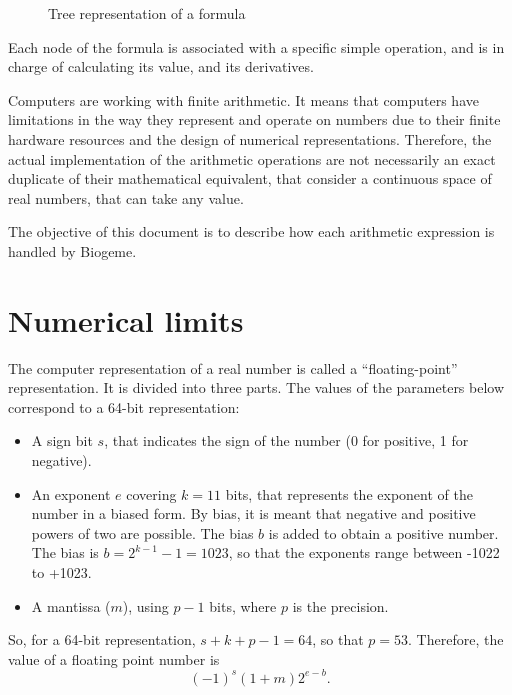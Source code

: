 \documentclass[12pt,a4paper]{article}
\begin{document}
\begin{figure}[htb]
  \begin{center}
  \end{center}
\caption{\label{fig:tree}Tree representation of a formula}
\end{figure}

Each node of the formula is associated with a specific simple
operation, and is in charge of calculating its value, and its
derivatives.


Computers are working with finite arithmetic. It means that computers
have limitations in the way they represent and operate on numbers due
to their finite hardware resources and the design of numerical
representations.  Therefore, the actual implementation of the
arithmetic operations are not necessarily an exact duplicate of their
mathematical equivalent, that consider a continuous space of real
numbers, that can take any value.

The objective of this document is to describe how each arithmetic expression is handled by Biogeme. 

\section{Numerical limits}

The computer representation of a real number is called a ``floating-point'' representation. It is divided into three parts. The values of the parameters below correspond to a 64-bit representation:
\begin{itemize}
\item A sign bit $s$, that indicates the sign of the number (0 for positive, 1 for negative).
\item An exponent $e$ covering $k=11$ bits, that represents the exponent of the number in a biased form. By bias, it is meant that negative and positive powers of two are possible. The bias $b$ is added to obtain a positive number. The bias is $b=2^{k-1}-1=1023$, so that the exponents range between -1022 to +1023.
\item A mantissa ($m$), using $p-1$ bits, where $p$ is the precision. 
\end{itemize}
So, for a 64-bit representation, $s+k+p-1=64$, so that $p=53$.
Therefore, the value of a floating point number is
\[
(-1)^s (1+m) 2^{e-b}.
\]
\end{document}
